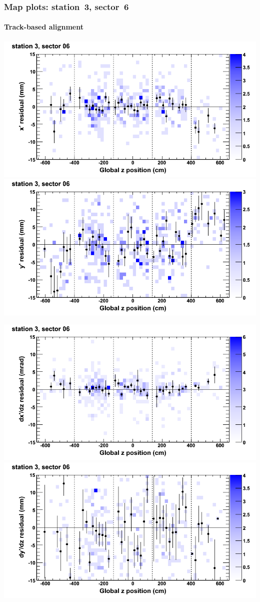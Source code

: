 \documentclass[compress]{beamer}
\begin{document}
\begin{frame}
\frametitle{Map plots: station~3, sector~6}
\framesubtitle{Track-based alignment}
\includegraphics[width=0.5\linewidth]{mapplots_re05/DTvsz_st3sec06_x.png}
\includegraphics[width=0.5\linewidth]{mapplots_re05/DTvsz_st3sec06_y.png}

\includegraphics[width=0.5\linewidth]{mapplots_re05/DTvsz_st3sec06_dxdz.png}
\includegraphics[width=0.5\linewidth]{mapplots_re05/DTvsz_st3sec06_dydz.png}
\end{frame}
\end{document}
